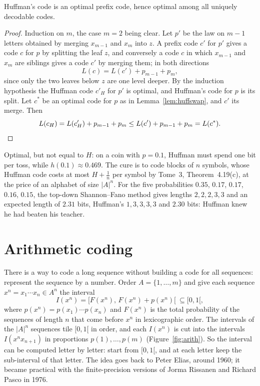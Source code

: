 \begin{theorem}[Huffman 1952]\label{thm:huffman}
Huffman's code is an optimal prefix code, hence optimal among all uniquely decodable codes.
\end{theorem}

\begin{proof}
Induction on $m$, the case $m=2$ being clear. Let $p'$ be the law on $m-1$ letters obtained by merging $x_{m-1}$ and $x_m$ into $z$. A prefix code $c'$ for $p'$ gives a code $c$ for $p$ by splitting the leaf $z$, and conversely a code $c$ in which $x_{m-1}$ and $x_m$ are siblings gives a code $c'$ by merging them; in both directions
\[
L(c)=L(c')+p_{m-1}+p_m,
\]
since only the two leaves below $z$ are one level deeper. By the induction hypothesis the Huffman code $c'_H$ for $p'$ is optimal, and Huffman's code for $p$ is its split. Let $c^*$ be an optimal code for $p$ as in Lemma~\ref{lem:huffswap}, and $c'$ its merge. Then
\[
L(c_H)=L(c'_H)+p_{m-1}+p_m\le L(c')+p_{m-1}+p_m=L(c^*).\qedhere
\]
\end{proof}

Optimal, but not equal to $H$: on a coin with $p=0.1$, Huffman must spend one bit per toss, while $h(0.1)\approx0.469$. The cure is to code blocks of $n$ symbols, whose Huffman code costs at most $H+\frac1n$ per symbol by Tome~3, Theorem~4.19(c), at the price of an alphabet of size $|A|^n$. For the five probabilities $0.35$, $0.17$, $0.17$, $0.16$, $0.15$, the top-down Shannon--Fano method gives lengths $2,2,2,3,3$ and an expected length of $2.31$ bits, Huffman's $1,3,3,3,3$ and $2.30$ bits: Huffman knew he had beaten his teacher.

\section{Arithmetic coding}\label{sec:arithmetic}

There is a way to code a long sequence without building a code for all sequences: represent the sequence by a number. Order $A=\{1,\dots,m\}$ and give each sequence $x^n=x_1\cdots x_n\in A^n$ the interval
\[
I(x^n)=\bigl[F(x^n),\,F(x^n)+p(x^n)\bigr[\ \subseteq[0,1[,
\]
where $p(x^n)=p(x_1)\cdots p(x_n)$ and $F(x^n)$ is the total probability of the sequences of length $n$ that come before $x^n$ in lexicographic order. The intervals of the $|A|^n$ sequences tile $[0,1[$ in order, and each $I(x^n)$ is cut into the intervals $I(x^nx_{n+1})$ in proportions $p(1),\dots,p(m)$ (Figure~\ref{fig:arith}). So the interval can be computed letter by letter: start from $[0,1[$, and at each letter keep the sub-interval of that letter. The idea goes back to Peter Elias, around 1960; it became practical with the finite-precision versions of Jorma Rissanen and Richard Pasco in 1976.

